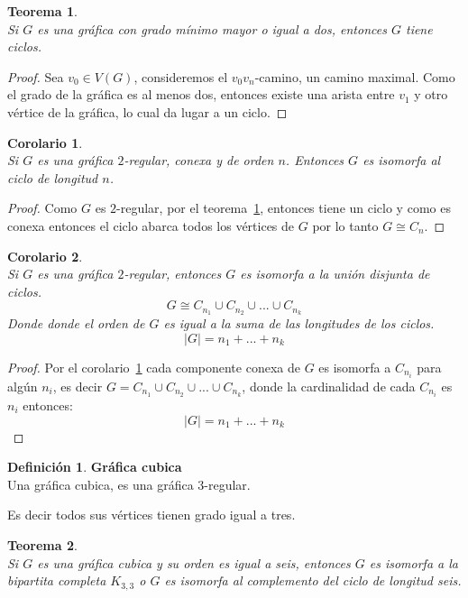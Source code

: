 \documentclass[11pt]{book}
\newtheorem{theorem}{Teorema}
\newtheorem{corollary}{Corolario}
\theoremstyle{definition}
\newtheorem{definition}{Definición}
\begin{document}
\begin{theorem}\textbf{}\\\label{teo8}
  Si $G$ es una gráfica con grado mínimo mayor o igual a dos, entonces $G$ tiene ciclos.
\end{theorem}

\begin{proof} Sea $v_0 \in V(G)$, consideremos el $v_0v_n$-camino, un
camino maximal. Como el grado de la gráfica es al menos dos, entonces
existe una arista entre $v_1$ y otro vértice de la gráfica, lo cual da
lugar a un ciclo.
\end{proof}

\begin{corollary}\textbf{}\\
  \label{gesciclo} Si $G$ es una gráfica $2$-regular, conexa y de orden $n$. Entonces $G$ es isomorfa al ciclo de longitud $n$.
\end{corollary}

\begin{proof} Como $G$ es $2$-regular, por el teorema~\ref{teo8},
entonces tiene un ciclo y como es conexa entonces el ciclo abarca
todos los vértices de $G$ por lo tanto $G \cong C_n$.
\end{proof}

\begin{corollary}\textbf{}\\
  Si $G$ es una gráfica $2$-regular, entonces $G$ es isomorfa a la unión disjunta de ciclos.$$G\cong C_{n_1}\cup C_{n_2}
  \cup ... \cup C_{n_k}$$
 Donde donde el orden de $G$ es igual a la suma de las longitudes de los ciclos. $$|G|=n_1 + ...+ n_k$$
\end{corollary}

\begin{proof} Por el corolario~\ref{gesciclo} cada componente conexa
de $G$ es isomorfa a $C_{n_i}$ para algún $n_i$, es decir
$G=C_{n_1}\cup C_{n_2} \cup ... \cup C_{n_k}$, donde la cardinalidad
de cada $C_{n_i}$ es $n_i$ entonces: $$|G|=n_1 + ...+ n_k$$
\end{proof}

\begin{definition}\textbf{Gráfica cubica}\\
  Una gráfica cubica, es una gráfica $3$-regular. 
\end{definition}
Es decir todos sus vértices tienen grado igual a tres.


\begin{theorem}\textbf{}\\
  Si $G$ es una gráfica cubica y su orden es igual a seis, entonces $G$ es isomorfa a la bipartita
  completa $K_{3,3}$ o $G$ es isomorfa al complemento del ciclo de longitud seis.
\end{theorem}
\end{document}
